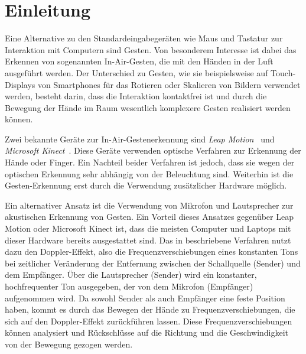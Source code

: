 \section{Einleitung}
\label{sec:intro}
Eine Alternative zu den Standardeingabegeräten wie Maus und Tastatur zur
Interaktion mit Computern sind Gesten.
Von besonderem Interesse ist dabei das Erkennen von sogenannten \glqq
In-Air\grqq -Gesten, die mit den Händen in der Luft ausgeführt werden. Der
Unterschied zu Gesten, wie sie beispielsweise auf Touch-Displays von Smartphones
für das Rotieren oder Skalieren von Bildern verwendet werden, besteht darin,
dass die Interaktion kontaktfrei ist und durch die Bewegung der Hände im Raum
wesentlich komplexere Gesten realisiert werden können.

Zwei bekannte Geräte zur In-Air-Gestenerkennung sind \textit{Leap
Motion}~\cite{LeapMotion} und \textit{Microsoft Kinect}~\cite{Kinect}. Diese Geräte
verwenden optische Verfahren zur Erkennung der Hände oder Finger. Ein Nachteil
beider Verfahren ist jedoch, dass sie wegen der optischen Erkennung sehr
abhängig von der Beleuchtung sind. Weiterhin ist die Gesten-Erkennung erst durch
die Verwendung zusätzlicher Hardware möglich.

Ein alternativer Ansatz ist die Verwendung von Mikrofon und Lautsprecher zur
akustischen Erkennung von Gesten. Ein Vorteil dieses Ansatzes gegenüber Leap
Motion oder Microsoft Kinect ist, dass die meisten Computer und Laptops mit
dieser Hardware bereits ausgestattet sind.
Das in \cite{Gupta2012} beschriebene Verfahren nutzt dazu den Doppler-Effekt,
also die Frequenzverschiebungen eines konstanten Tons bei zeitlicher Veränderung
der Entfernung zwischen der Schallquelle (Sender) und dem Empfänger.
Über die Lautsprecher (Sender) wird ein konstanter, hochfrequenter Ton
ausgegeben, der von dem Mikrofon (Empfänger) aufgenommen wird.
Da sowohl Sender als auch Empfänger eine feste Position haben, kommt es durch
das Bewegen der Hände zu Frequenzverschiebungen, die sich auf den Doppler-Effekt
zurückführen lassen.
Diese Frequenzverschiebungen können analysiert und Rückschlüsse auf die Richtung
und die Geschwindigkeit von der Bewegung gezogen werden.


